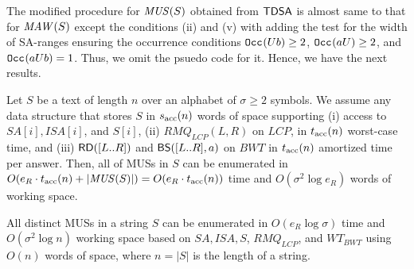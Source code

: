 The modified procedure  for $\MUS(S)$ obtained from $\textsf{TDSA}$ is almost same to that for $\MAW(S)$ except the conditions (ii) and (v) with adding the test for the width of SA-ranges ensuring the occurrence conditions $\mathtt{Occ}_{}(Ub) \ge 2$, $\mathtt{Occ}_{}(aU) \ge 2$, and $\mathtt{Occ}_{}(aUb) = 1$. Thus, we omit the psuedo code for it.
Hence, we have the next results.

\begin{theorem}\label{thm:algo:main}
  Let $S$ be a text of length $n$ over an alphabet of $\sigma\ge 2$ symbols.
  We assume any data structure that stores $S$ in $s_{\mathrm{acc}}(n)$ words of space supporting
  (i) access to $SA[i], ISA[i]$, and $S[i]$, 
  (ii) $RMQ_{LCP}(L, R)$ on $LCP$, 
  in $t_{\mathrm{acc}}(n)$ worst-case time, and 
  (iii) $\mbox{\textsf{RD}}([L..R])$ and $\mbox{\textsf{BS}}([L..R], a)$ on $BWT$ 
  in $t_{\mathrm{acc}}(n)$ amortized time per answer. 
  Then, all of MUSs in $S$ can be enumerated
  in $O(e_R\cdot t_\fn{acc}(n) + |\MUS(S)|) = O(e_R\cdot t_\fn{acc}(n))$ time and
  $O(\sigma^2 \log e_R)$ words of working space. 
\end{theorem}


\begin{theorem}\label{thm:algo:uncompressed:sa}
All distinct MUSs in a string $S$ can be enumerated in $O(e_R \log\sigma)$ time and $O(\sigma^2 \log n)$ working space based on $SA, ISA, S$, $RMQ_{LCP}$, and $WT_{BWT}$ using $O(n)$ words of space, where $n = |S|$ is the length of a string. 
\end{theorem}






